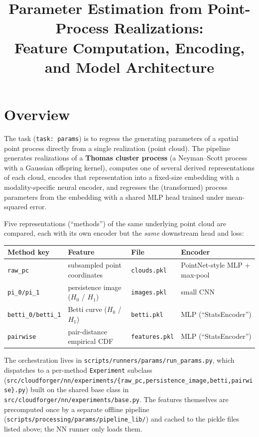 \documentclass[11pt]{article}
\title{Parameter Estimation from Point-Process Realizations:\\
Feature Computation, Encoding, and Model Architecture}
\author{}
\date{}
\begin{document}
\maketitle

\section{Overview}

The task (\texttt{task: params}) is to regress the generating parameters of a
spatial point process directly from a single realization (point cloud). The
pipeline generates realizations of a \textbf{Thomas cluster process}
(a Neyman--Scott process with a Gaussian offspring kernel), computes one of
several derived representations of each cloud, encodes that representation
into a fixed-size embedding with a modality-specific neural encoder, and
regresses the (transformed) process parameters from the embedding with a
shared MLP head trained under mean-squared error.

Five representations (``methods'') of the same underlying point cloud are
compared, each with its own encoder but the \emph{same} downstream head and
loss:

\begin{center}
\begin{tabular}{@{}llll@{}}
\toprule
Method key & Feature & File & Encoder \\
\midrule
\texttt{raw\_pc}   & subsampled point coordinates            & \texttt{clouds.pkl}   & PointNet-style MLP + max-pool \\
\texttt{pi\_0/pi\_1}   & persistence image ($H_0$ / $H_1$)    & \texttt{images.pkl}   & small CNN \\
\texttt{betti\_0/betti\_1} & Betti curve ($H_0$ / $H_1$)       & \texttt{betti.pkl}    & MLP (``StatsEncoder'') \\
\texttt{pairwise}  & pair-distance empirical CDF               & \texttt{features.pkl} & MLP (``StatsEncoder'') \\
\bottomrule
\end{tabular}
\end{center}

The orchestration lives in \texttt{scripts/runners/params/run\_params.py},
which dispatches to a per-method \texttt{Experiment} subclass
(\texttt{src/cloudforger/nn/experiments/\allowbreak\{raw\_pc,persistence\_image,betti,pairwise\}.py})
built on the shared base class in
\texttt{src/cloudforger/nn/experiments/base.py}. The features themselves are
precomputed once by a separate offline pipeline
(\texttt{scripts/processing/params/pipeline\_lib/}) and cached to the pickle
files listed above; the NN runner only loads them.
\end{document}
